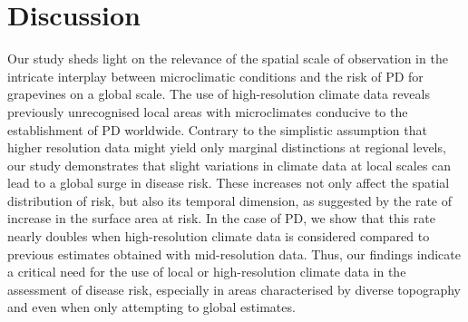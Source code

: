 \begin{table}[H]
    \centering
    \caption{Comparison of grapevine presence locations at risk in key
        viticulture regions using CHELSA and ERA5 datasets}
    \label{tab:risk_increase_vid}
\end{table}

\section{Discussion}

Our study sheds light on the  relevance of the spatial scale of observation
in the intricate interplay between microclimatic conditions and the risk of PD
for grapevines on a global scale. The use of high-resolution climate data
reveals previously unrecognised local areas with microclimates conducive to the
establishment of PD worldwide. Contrary to the simplistic assumption that
higher resolution data might yield only marginal distinctions at regional
levels, our study demonstrates that slight variations in climate data at local
scales can lead to a global surge in disease risk. These increases  not only
affect the spatial distribution of risk, but also its temporal dimension, as
suggested by the rate of increase in the surface area at risk. In the case of
PD, we show that this rate nearly doubles when high-resolution climate data is
considered compared to previous estimates obtained with mid-resolution data.
Thus, our findings indicate a critical need for the use of local or
high-resolution climate data in the assessment of disease risk, especially in
areas characterised by diverse topography and even when only attempting to
global estimates.


